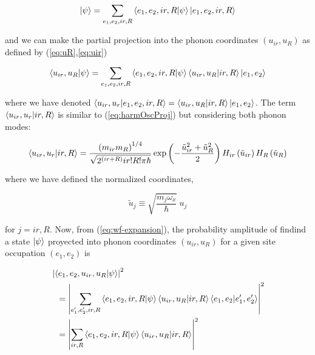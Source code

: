 \begin{equation}
  \label{eq:wf-phonon-base}
  \left | \psi \right\rangle=\sum_{e_1,e_2,ir,R} \left\langle e_1,e_2,ir,R|\psi\right\rangle\left | e_1,e_2,ir,R \right\rangle
\end{equation}

\noindent and we can make the partial projection into the phonon coordinates $(u_{ir},u_R)$ as defined by (\ref{eq:uR},\ref{eq:uir})

\begin{equation}
  \label{eq:wf-expansion}
  \left\langle u_{ir},u_R|\psi\right\rangle=\sum_{e_1,e_2,ir,R} \left\langle e_1,e_2,ir,R|\psi\right\rangle\left\langle u_{ir},u_R|ir,R\right\rangle\left | e_1,e_2 \right\rangle
\end{equation}

\noindent where we have denoted $\left\langle u_{ir},u_r|e_1,e_2,ir,R\right\rangle=\left\langle u_{ir},u_R|ir,R\right\rangle\left | e_1,e_2 \right\rangle$. 
The term $\left\langle u_{ir},u_r|ir,R\right\rangle$ is similar to (\ref{eq:harmOscProj}) but considering both phonon modes:

\begin{equation}
  \label{eq:hermite-expansion}
  \left\langle u_{ir},u_r|ir,R\right\rangle  = \frac{\left(m_{ir}m_R\right)^{1/4}}{\sqrt{2^{(ir+R)} ir!R!\pi\hbar}}
  \exp\left(-\frac{\tilde{u}_{ir}^2 + \tilde{u}_R^2}{2}\right) 
  H_{ir}\left(\tilde{u}_{ir} \right)H_{R}\left(\tilde{u}_{R} \right)
\end{equation}

\noindent where we have defined the normalized coordinates,

\begin{equation}
  \label{eq:uTildeDef}
  \tilde{u}_j \equiv \sqrt{\frac{m_j\omega_x}{\hbar}}\ u_j
\end{equation}

\noindent for $j=ir,R$. 
Now, from (\ref{eq:wf-expansion}), the probability amplitude of findind a state $\left | \psi \right\rangle$ proyected into phonon coordinates $(u_{ir},u_R)$ for a given site occupation $(e_1,e_2)$ is

\begin{equation}
  \begin{split}
    & \left|\left\langle e_1,e_2,u_{ir},u_R|\psi\right\rangle\right|^2 \\
    & \ \ = \left|\sum_{e_1',e_2',ir,R}\left\langle e_1,e_2,ir,R|\psi\right\rangle\left\langle u_{ir},u_R|ir,R\right\rangle\left\langle e_1,e_2|e_1',e_2'\right\rangle\right|^2 \\
    & \ \ = \left|\sum_{ir,R}\left\langle e_1,e_2,ir,R|\psi\right\rangle\left\langle u_{ir},u_R|ir,R\right\rangle\right|^2
  \end{split}
\end{equation}

